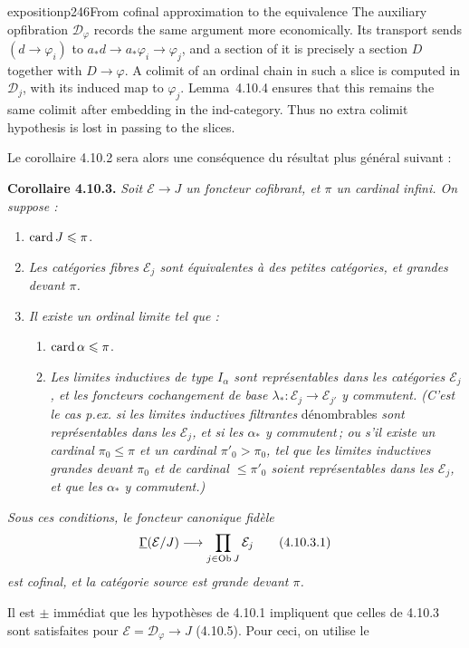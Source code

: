 \begin{dcomment}{exposition}{p246}{From cofinal approximation to the equivalence}
The auxiliary opfibration $\mathcal D_\varphi$ records the same argument more economically. Its transport sends $(d\to\varphi_i)$ to $a_*d\to a_*\varphi_i\to\varphi_j$, and a section of it is precisely a section $D$ together with $D\to\varphi$. A colimit of an ordinal chain in such a slice is computed in $\mathcal D_j$, with its induced map to $\varphi_j$. Lemma~4.10.4 ensures that this remains the same colimit after embedding in the ind-category. Thus no extra colimit hypothesis is lost in passing to the slices.
\end{dcomment}


Le corollaire 4.10.2 sera alors une conséquence du résultat plus général suivant :

\textbf{Corollaire 4.10.3.} \textit{Soit $\mathcal{E} \longrightarrow J$ un foncteur cofibrant, et $\pi$ un cardinal infini. On suppose :}
\begin{enumerate}[label={}, leftmargin=3em]
\item[\textit{a)}] $\operatorname{card} J \leqslant \pi$.
\item[\textit{b)}] \textit{Les catégories fibres $\mathcal{E}_j$ sont équivalentes à des petites catégories, et grandes devant $\pi$.}
\item[\textit{c)}] \textit{Il existe un ordinal limite tel que :}
\begin{enumerate}[label={}, leftmargin=3em]
\item[\textit{1°)}] $\operatorname{card} \alpha \leqslant \pi$.
\item[\textit{2°)}] \textit{Les limites inductives de type $I_\alpha$ sont représentables dans les catégories $\mathcal{E}_j$, et les foncteurs cochangement de base $\lambda_* : \mathcal{E}_j \longrightarrow \mathcal{E}_{j'}$ y commutent. (C'est le cas p.ex. si les limites inductives filtrantes} dénombrables \textit{sont représentables dans les $\mathcal{E}_j$, et si les $\alpha_*$ y commutent\,; ou s'il existe un cardinal $\pi_0 \leqslant \pi$ et un cardinal $\pi'_0 > \pi_0$, tel que les limites inductives grandes devant $\pi_0$ et de cardinal $\leqslant \pi'_0$ soient représentables dans les $\mathcal{E}_j$, et que les $\alpha_*$ y commutent.)}
\end{enumerate}
\end{enumerate}
\textit{Sous ces conditions, le foncteur canonique fidèle}
\[
\underline{\Gamma}(\mathcal{E}/J) \longrightarrow \prod_{j\in\operatorname{Ob} J} \mathcal{E}_j \tag*{(4.10.3.1)}
\]
\textit{est cofinal, et la catégorie source est grande devant $\pi$.}

Il est $\pm$ immédiat que les hypothèses de 4.10.1 impliquent que celles de 4.10.3 sont satisfaites pour $\mathcal{E} = \mathcal{D}_\varphi \longrightarrow J$ (4.10.5). Pour
ceci, on utilise le

